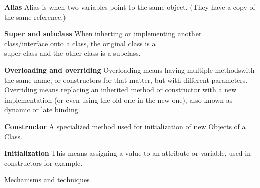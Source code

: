 \documentclass{article}
\begin{document}
\begin{Parallel}[v]{0.49\textwidth}{0.49\textwidth}
{        \textbf{Alias}\newline
        Alias is when two variables point to the same object.
        (They have a copy of the same reference.)
        \\

        \textbf{Super and subclass}\newline
        When inherting or implementing another\\class/interface onto a class, the original class is
        a\\super class and the other class is a subclass.

        \textbf{Overloading and overriding}\newline
        Overloading means having multiple methodswith the same name, or constructors for that matter,
        but with different parameters.\\
        Overriding means replacing an inherited method or constructor with a new implementation
        (or even using the old one in the new one), also known as dynamic or late binding.

        \textbf{Constructor}\newline
        A specialized method used for initialization of new Objects of a Class.

        \textbf{Initialization}\newline
        This means assigning a value to an attribute or variable, used in constructors for example.
    }
    \ParallelPar
\end{Parallel}

\newpage
\begin{center}
    {\huge Mechanisms and techniques}
\end{center}
\end{document}

